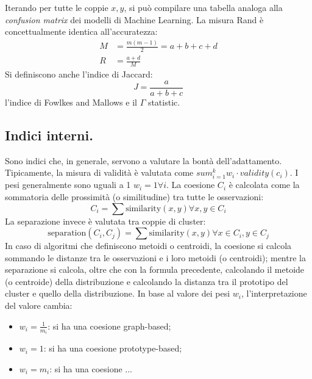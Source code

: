 \documentclass[11pt, a4page, twocolumn]{article}
\begin{document}
Iterando per tutte le coppie $x, y$, si può compilare una tabella analoga alla \textit{confusion matrix} dei modelli di Machine Learning.
La misura Rand è concettualmente identica all'accuratezza:
\begin{align*}
  M &= \frac{m(m-1)}{2} = a + b + c + d \\
  R &= \frac{a+d}{M}
\end{align*}
Si definiscono anche l'indice di Jaccard:
\begin{equation*}
  J = \frac{a}{a + b + c}
\end{equation*}
l'indice di Fowlkes and Mallows e il $\Gamma$ statistic.

\subsection{Indici interni.}
Sono indici che, in generale, servono a valutare la bontà dell'adattamento.
Tipicamente, la misura di validità è valutata come $sum_{i=1}^{k}{w_i·validity(c_i)}$.
I pesi generalmente sono uguali a 1 $w_i = 1 \forall{i}$.
La coesione $C_i$ è calcolata come la sommatoria delle prossimità (o similitudine) tra tutte le osservazioni:
\begin{equation*}
  C_i = \sum{\text{similarity}(x, y)} \forall{x, y \in C_i}
\end{equation*}
La separazione invece è valutata tra coppie di cluster:
\begin{equation*}
  \text{separation}(C_i, C_j) = \sum{\text{similarity}(x, y)} \forall{x \in C_i, y \in C_j}
\end{equation*}
In caso di algoritmi che definiscono metoidi o centroidi, la coesione si calcola sommando le distanze tra le osservazioni e i loro metoidi (o centroidi); mentre la separazione si calcola, oltre che con la formula precedente, calcolando il metoide (o centroide) della distribuzione e calcolando la distanza tra il prototipo del cluster e quello della distribuzione.
In base al valore dei pesi $w_i$, l'interpretazione del valore cambia:
\begin{itemize}
\item $w_i = \frac{1}{m_i}$: si ha una coesione graph-based;
\item $w_i = 1$: si ha una coesione prototype-based;
\item $w_i = m_i$: si ha una coesione ...
\end{itemize}
\end{document}
